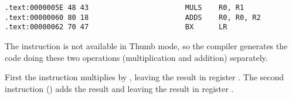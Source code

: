 \subsectionold{\OptimizingKeilVI (\ThumbMode)}

\begin{lstlisting}[label=ARM_leaf_example2]
.text:0000005E 48 43                       MULS    R0, R1
.text:00000060 80 18                       ADDS    R0, R0, R2
.text:00000062 70 47                       BX      LR
\end{lstlisting}

The  instruction is not available in Thumb mode, so the compiler generates the code doing these two 
operations (multiplication and addition) separately.

First the  instruction multiplies  by , leaving the result in register .
The second instruction () adds the result and  leaving the result in register .

